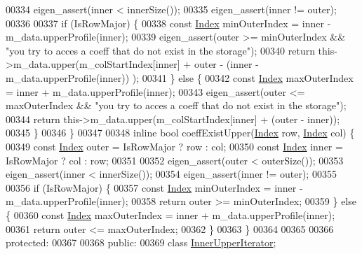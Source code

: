 \begin{DoxyCode}
00334         eigen\_assert(inner < innerSize());
00335         eigen\_assert(inner != outer);
00336 
00337         \textcolor{keywordflow}{if} (IsRowMajor) \{
00338             \textcolor{keyword}{const} \hyperlink{group___core___module_a554f30542cc2316add4b1ea0a492ff02}{Index} minOuterIndex = inner - m\_data.upperProfile(inner);
00339             eigen\_assert(outer >= minOuterIndex && \textcolor{stringliteral}{"you try to acces a coeff that do not exist in the
       storage"});
00340             \textcolor{keywordflow}{return} this->m\_data.upper(m\_colStartIndex[inner] + outer - (inner - m\_data.upperProfile(inner))
      );
00341         \} \textcolor{keywordflow}{else} \{
00342             \textcolor{keyword}{const} \hyperlink{group___core___module_a554f30542cc2316add4b1ea0a492ff02}{Index} maxOuterIndex = inner + m\_data.upperProfile(inner);
00343             eigen\_assert(outer <= maxOuterIndex && \textcolor{stringliteral}{"you try to acces a coeff that do not exist in the
       storage"});
00344             \textcolor{keywordflow}{return} this->m\_data.upper(m\_colStartIndex[inner] + (outer - inner));
00345         \}
00346     \}
00347 
00348     \textcolor{keyword}{inline} \textcolor{keywordtype}{bool} coeffExistUpper(\hyperlink{group___core___module_a554f30542cc2316add4b1ea0a492ff02}{Index} row, \hyperlink{group___core___module_a554f30542cc2316add4b1ea0a492ff02}{Index} col) \{
00349         \textcolor{keyword}{const} \hyperlink{group___core___module_a554f30542cc2316add4b1ea0a492ff02}{Index} outer = IsRowMajor ? row : col;
00350         \textcolor{keyword}{const} \hyperlink{group___core___module_a554f30542cc2316add4b1ea0a492ff02}{Index} inner = IsRowMajor ? col : row;
00351 
00352         eigen\_assert(outer < outerSize());
00353         eigen\_assert(inner < innerSize());
00354         eigen\_assert(inner != outer);
00355 
00356         \textcolor{keywordflow}{if} (IsRowMajor) \{
00357             \textcolor{keyword}{const} \hyperlink{group___core___module_a554f30542cc2316add4b1ea0a492ff02}{Index} minOuterIndex = inner - m\_data.upperProfile(inner);
00358             \textcolor{keywordflow}{return} outer >= minOuterIndex;
00359         \} \textcolor{keywordflow}{else} \{
00360             \textcolor{keyword}{const} \hyperlink{group___core___module_a554f30542cc2316add4b1ea0a492ff02}{Index} maxOuterIndex = inner + m\_data.upperProfile(inner);
00361             \textcolor{keywordflow}{return} outer <= maxOuterIndex;
00362         \}
00363     \}
00364 
00365 
00366 \textcolor{keyword}{protected}:
00367 
00368 \textcolor{keyword}{public}:
00369     \textcolor{keyword}{class }\hyperlink{class_eigen_1_1_skyline_matrix_1_1_inner_upper_iterator}{InnerUpperIterator};

\end{DoxyCode}
